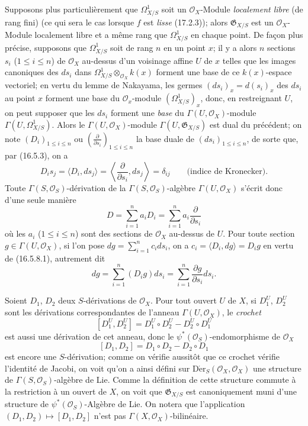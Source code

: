 \begin{env}[16.5.8]
\label{IV.16.5.8}
Supposons plus particulièrement que $\Omega_{X/S}^1$ soit un
$\mathcal{O}_X$-Module \emph{localement libre} (de rang fini) (ce qui sera le
cas lorsque $f$ est \emph{lisse} (17.2.3)); alors $\mathfrak{G}_{X/S}$ est un
$\mathcal{O}_X$-Module localement libre et a même rang que $\Omega_{X/S}^1$
en chaque point. De façon plus précise, supposons que $\Omega_{X/S}^1$ soit de
rang $n$ en un point $x$; il y a alors $n$ sections $s_i$ ($1\leq i\leq n$)
de $\mathcal{O}_X$ au-dessus d'un voisinage affine $U$ de $x$ telles que les
images canoniques des $ds_i$ dans
$\Omega_{X/S}^1\otimes_{\mathcal{O}_X}k(x)$ forment une base de ce
$k(x)$-espace vectoriel; en vertu du lemme de Nakayama, les germes
$(ds_i)_x=d(s_i)_x$ des $ds_i$ au point $x$ forment une base du
$\mathcal{O}_x$-module $(\Omega_{X/S}^1)_x$, donc, en restreignant $U$, on
peut supposer que les $ds_i$ forment une \emph{base} du
$\Gamma(U,\mathcal{O}_X)$-module $\Gamma(U,\Omega_{X/S}^1)$. Alors le
$\Gamma(U,\mathcal{O}_X)$-module $\Gamma(U,\mathfrak{G}_{X/S})$ est dual du
précédent; on note $(D_i)_{1\leq i\leq n}$ ou
$\left(\frac{\partial}{\partial s_i}\right)_{1\leq i\leq n}$ la base duale de
$(ds_i)_{1\leq i\leq n}$, de sorte que, par (16.5.3), on a
\[
  D_is_j=\langle D_i,ds_j\rangle
  =\left\langle\frac{\partial}{\partial s_i},ds_j\right\rangle
  =\delta_{ij}\qquad\text{(indice de Kronecker).}
  \tag{16.5.8.1}
  \label{IV.16.5.8.1}
\]
Toute $\Gamma(S,\mathcal{O}_S)$-dérivation de la
$\Gamma(S,\mathcal{O}_S)$-algèbre $\Gamma(U,\mathcal{O}_X)$ s'écrit donc
d'une seule manière
\[
  D=\sum_{i=1}^n a_iD_i=\sum_{i=1}^n a_i\frac{\partial}{\partial s_i}
\]
où les $a_i$ ($1\leq i\leq n$) sont des sections de $\mathcal{O}_X$ au-dessus
de $U$. Pour toute section $g\in\Gamma(U,\mathcal{O}_X)$, si l'on pose
$dg=\sum_{i=1}^n c_i ds_i$, on a
$c_i=\langle D_i,dg\rangle=D_ig$ en vertu de (16.5.8.1), autrement dit
\[
  dg=\sum_{i=1}^n(D_ig)ds_i
  =\sum_{i=1}^n\frac{\partial g}{\partial s_i}ds_i.
  \tag{16.5.8.2}
  \label{IV.16.5.8.2}
\]
\end{env}

\begin{env}[16.5.9]
\label{IV.16.5.9}
Soient $D_1$, $D_2$ deux $S$-dérivations de $\mathcal{O}_X$. Pour tout ouvert
$U$ de $X$, si $D_1^U$, $D_2^U$ sont les dérivations correspondantes de
l'anneau $\Gamma(U,\mathcal{O}_X)$, le \emph{crochet}
\[
  [D_1^U,D_2^U]=D_1^U\circ D_2^U-D_2^U\circ D_1^U
\]
est aussi une dérivation de cet anneau, donc le
$\psi^*(\mathcal{O}_S)$-endomorphisme de $\mathcal{O}_X$
\[
  [D_1,D_2]=D_1\circ D_2-D_2\circ D_1
  \tag{16.5.9.1}
  \label{IV.16.5.9.1}
\]
est encore une $S$-dérivation; comme on vérifie aussitôt que ce crochet
vérifie l'identité de Jacobi, on voit qu'on a ainsi défini sur
$\operatorname{D\acute{e}r}_S(\mathcal{O}_X,\mathcal{O}_X)$ une structure de
$\Gamma(S,\mathcal{O}_S)$-algèbre de Lie. Comme la définition de cette
structure commute à la restriction à un ouvert de $X$, on voit que
$\mathfrak{G}_{X/S}$ est canoniquement muni d'une structure de
$\psi^*(\mathcal{O}_S)$-Algèbre de Lie. On notera que l'application
$(D_1,D_2)\mapsto[D_1,D_2]$ n'est pas
$\Gamma(X,\mathcal{O}_X)$-bilinéaire.
\end{env}

